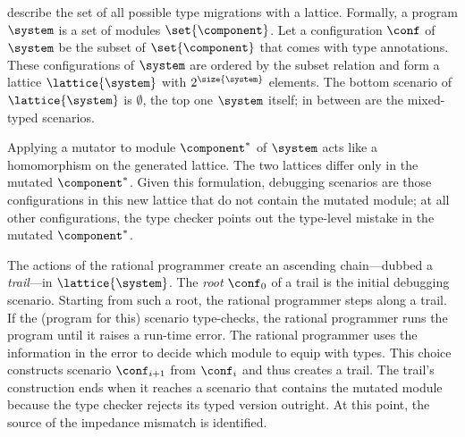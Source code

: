 
\citet{tfgnvf-popl-2016} describe the set of all possible type migrations with a
lattice. Formally, a program $\system$ is a set of modules $\set{\component}$.
Let a configuration $\conf$ of $\system$ be the subset of $\set{\component}$
that comes with type annotations. These configurations of $\system$ are ordered
by the subset relation and form a lattice $\lattice{\system}$ with
$2^{\size{\system}}$ elements. The bottom scenario of $\lattice{\system}$ is
$\emptyset$, the top one $\system$ itself; in between are the mixed-typed
scenarios.

Applying a mutator to module $\component^*$ of $\system$ acts like a homomorphism
on the generated lattice. The two lattices differ only in the mutated
$\component^*$. Given this formulation, debugging scenarios are those configurations in
this new lattice that do not contain the mutated module; at all other configurations, the type
checker points out the type-level mistake in the mutated $\component^*$.

The actions of the rational programmer create an ascending chain---dubbed a
\emph{trail}---in $\lattice{\system}$.  The {\em root\/} $\conf_0$ of a trail is
the initial debugging scenario.  Starting from such a root, the rational
programmer steps along a trail. If the (program for this) scenario type-checks,
the rational programmer runs the program until it raises a run-time error.  The
rational programmer uses the information in the error to decide which module to
equip with types. This choice constructs scenario $\conf_{i+1}$ from $\conf_{i}$
and thus creates a trail. The trail's construction ends when it reaches a
scenario that contains the mutated module because the type checker rejects its
typed version outright.  At this point, the source of the impedance mismatch is
identified.
